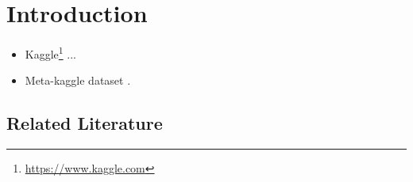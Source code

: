 \documentclass[mnsc]{informs3}
\begin{document}
%



\section{Introduction}

\begin{itemize}
\item Kaggle\footnote{\url{https://www.kaggle.com}} ...
\item Meta-kaggle dataset \cite{megan_risdal_timo_bozsolik_2022}. 
\end{itemize}

\subsection{Related Literature}
\end{document}
